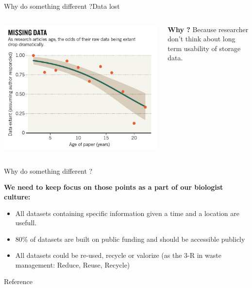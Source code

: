 \documentclass{eecslides}
\begin{document}
\begin{frame}{Why do something different ?}{Data lost}


\begin{columns}[c]
	\begin{column}{.50\paperwidth}
		\includegraphics[width=.50\paperwidth]{Nature_fig.jpg}
	\end{column}
	\begin{column}{.4\paperwidth}
		\textbf{Why ?} Because researcher don't think about long term usability of storage data.
	\end{column}
\end{columns}

\end{frame}


\begin{frame}{Why do something different ?}

\textbf{We need to keep focus on those points as a part of our biologist culture:}
	
	\begin{itemize}
		\item \alert{All datasets} containing specific information given a time and a location \alert{are usefull}.
		\item 80\% of datasets are built on \alert{public funding} \citep{Graham2013} and should be accessible publicly
		\item All datasets could be re-used, recycle or valorize (as the 3-R in waste management: Reduce, Reuse, Recycle) 
	\end{itemize}


\end{frame}


\nocite{Poisot2013a}

\begin{frame}[allowsframebreaks]{Reference}
	
		
\end{frame}
\end{document}
